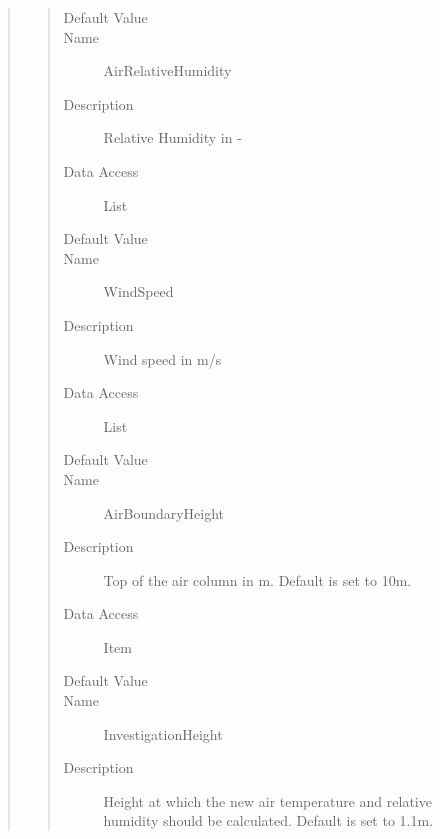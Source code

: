 \documentclass[letterpaper,10pt,english]{sphinxmanual}
\begin{document}
\begin{quote}
\begin{description}
\begin{quote}
\begin{description}
\item[{Default Value}] \leavevmode
{}

\item[{Name}] \leavevmode
AirRelativeHumidity

\item[{Description}] \leavevmode
Relative Humidity in -

\item[{Data Access}] \leavevmode
List

\item[{Default Value}] \leavevmode
{}

\item[{Name}] \leavevmode
WindSpeed

\item[{Description}] \leavevmode
Wind speed in m/s

\item[{Data Access}] \leavevmode
List

\item[{Default Value}] \leavevmode
{}

\item[{Name}] \leavevmode
AirBoundaryHeight

\item[{Description}] \leavevmode
Top of the air column in m. Default is set to 10m.

\item[{Data Access}] \leavevmode
Item

\item[{Default Value}] \leavevmode
{}

\item[{Name}] \leavevmode
InvestigationHeight

\item[{Description}] \leavevmode
Height at which the new air temperature and relative humidity should be calculated.
Default is set to 1.1m.


\end{description}
\end{quote}
\end{description}
\end{quote}
\end{document}
